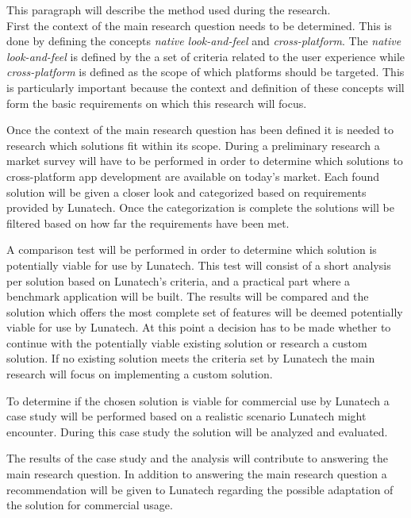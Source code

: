 
This paragraph will describe the method used during the research.\\

First the context of the main research question needs to be determined. This is done by defining the concepts \emph{native look-and-feel} and \emph{cross-platform}. The \emph{native look-and-feel} is defined by the a set of criteria related to the user experience while \emph{cross-platform} is defined as the scope of which platforms should be targeted. This is particularly important because the context and definition of these concepts will form the basic requirements on which this research will focus.

Once the context of the main research question has been defined it is needed to research which solutions fit within its scope. During a preliminary research a market survey will have to be performed in order to determine which solutions to cross-platform app development are available on today's market. Each found solution will be given a closer look and categorized based on requirements provided by Lunatech. Once the categorization is complete the solutions will be filtered based on how far the requirements have been met.

A comparison test will be performed in order to determine which solution is potentially viable for use by Lunatech. This test will consist of a short analysis per solution based on Lunatech's criteria, and a practical part where a benchmark application will be built. The results will be compared and the solution which offers the most complete set of features will be deemed potentially viable for use by Lunatech. At this point a decision has to be made whether to continue with the potentially viable existing solution or research a custom solution. If no existing solution meets the criteria set by Lunatech the main research will focus on implementing a custom solution.

To determine if the chosen solution is viable for commercial use by Lunatech a case study will be performed based on a realistic scenario Lunatech might encounter. During this case study the solution will be analyzed and evaluated.

The results of the case study and the analysis will contribute to answering the main research question. In addition to answering the main research question a recommendation will be given to Lunatech regarding the possible adaptation of the solution for commercial usage.

